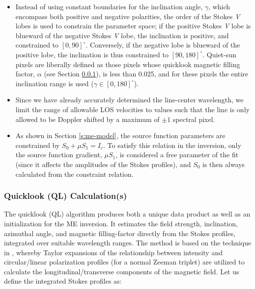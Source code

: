 \documentclass[11pt]{article}
\begin{document}
\begin{itemize}
  \renewcommand\labelitemi{\scriptsize$\blacksquare$}
  \item Instead of using constant boundaries for the inclination angle, $\gamma$, which encompass
        both positive and negative polarities, the order of the Stokes \textit{V} lobes is used to
        constrain the parameter space; if the positive Stokes \textit{V} lobe is blueward of the
        negative Stokes \textit{V} lobe, the inclination is positive, and constrained to $[0,90]^{\circ}$.
        Conversely, if the negative lobe is blueward of the positive lobe, the inclination is
        thus constrained to $[90,180]^{\circ}$.  Quiet-sun pixels are liberally defined as those pixels
        whose quicklook magnetic filling factor, $\alpha$ (see Section \ref{ss:ql}), is less than 0.025,
        and for these pixels the entire inclination range is used ($\gamma \in [0,180]^{\circ}$).
  \item Since we have already accurately determined the line-center wavelength, we limit the range of
        allowable LOS velocities to values such that the line is only allowed to be Doppler shifted by
        a maximum of $\pm 1$ spectral pixel.
  \item As shown in Section \ref{s:me-model}, the source function parameters are constrained
        by $S_{0} + \mu S_{1} = I_{c}$.  To satisfy this relation in the inversion, only the
        source function gradient, $\mu S_{1}$, is considered a free parameter of the fit (since
        it affects the amplitudes of the Stokes profiles), and $S_{0}$ is then always calculated
        from the constraint relation.
\end{itemize}

\subsubsection{Quicklook (QL) Calculation(s)}\label{ss:ql}
The quicklook (QL) algorithm produces both a unique data product as well as an initialization
for the ME inversion.  It estimates the field strength, inclination, azimuthal angle, and magnetic
filling-factor directly from the Stokes profiles, integrated over suitable wavelength ranges.
The method is based on the technique in \citet{ronan:1987}, whereby Taylor expansions
of the relationship between intensity and circular/linear polarization profiles (for a normal Zeeman
triplet) are utilized to calculate the longitudinal/transverse components of the magnetic field.  Let
us define the integrated Stokes profiles as:
\end{document}
